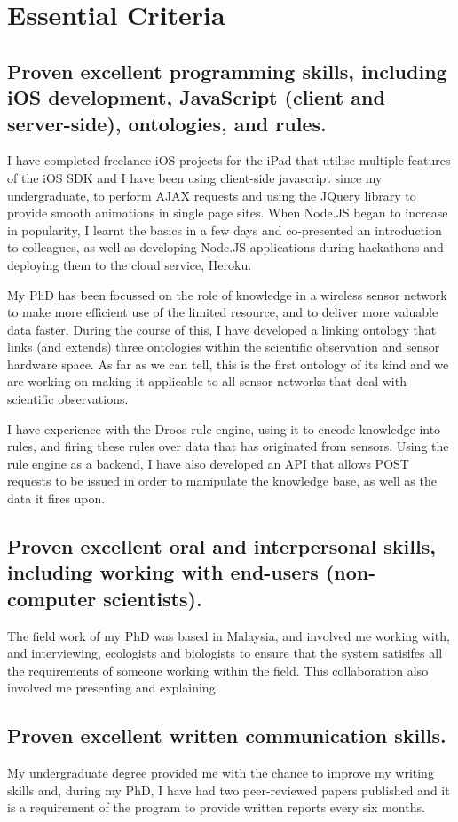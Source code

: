 \documentclass[10pt,a4paper]{article}
\begin{document}
\section{Essential Criteria}
\subsection{Proven excellent programming skills, including iOS development, JavaScript (client and server-side), ontologies, and rules.}
I have completed freelance iOS projects for the iPad that utilise multiple features of the iOS SDK and I have been using client-side javascript since my undergraduate, to perform AJAX requests and using the JQuery library to provide smooth animations in single page sites. When Node.JS began to increase in popularity, I learnt the basics in a few days and co-presented an introduction to colleagues, as well as developing Node.JS applications during hackathons and deploying them to the cloud service, Heroku. 

My PhD has been focussed on the role of knowledge in a wireless sensor network to make more efficient use of the limited resource, and to deliver more valuable data faster. During the course of this, I have developed a linking ontology that links (and extends) three ontologies within the scientific observation and sensor hardware space. As far as we can tell, this is the first ontology of its kind and we are working on making it applicable to all sensor networks that deal with scientific observations.

I have experience with the Droos rule engine, using it to encode knowledge into rules, and firing these rules over data that has originated from sensors. Using the rule engine as a backend, I have also developed an API that allows POST requests to be issued in order to manipulate the knowledge base, as well as the data it fires upon.

\subsection{Proven excellent oral and interpersonal skills, including working with end-users (non-computer scientists).}
The field work of my PhD was based in Malaysia, and involved me working with, and interviewing, ecologists and biologists to ensure that the system satisifes all the requirements of someone working within the field. This collaboration also involved me presenting and explaining

\subsection{Proven excellent written communication skills.}
My undergraduate degree provided me with the chance to improve my writing skills and, during my PhD, I have had two peer-reviewed papers published and it is a requirement of the program to provide written reports every six months.
\end{document}
